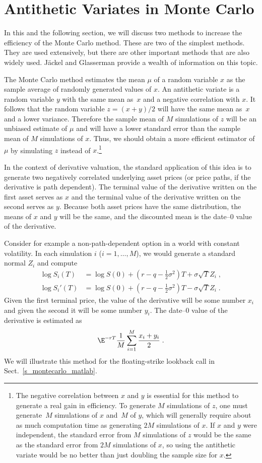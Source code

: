 \section{Antithetic Variates in Monte Carlo}

In this and the following section, we will discuss two methods to increase the efficiency of the Monte Carlo method.  These are two of the simplest methods.  They are used extensively, but there are other important methods that are also widely used.  J\"ackel \cite{Jackel} and Glasserman \cite{Glasserman} provide a wealth of information on this topic.

The Monte Carlo method estimates the mean $\mu$ of a random variable $x$ as the sample average of randomly generated values of $x$.  An antithetic variate  is a random variable $y$ with the same mean as~$x$ and a negative correlation with $x$.  It follows that the random variable $z=(x+y)/2$ will have the same mean as~$x$ and a lower variance.  Therefore the sample mean of $M$ simulations of $z$ will be an unbiased estimate of $\mu$ and will have a lower standard error than the sample mean of $M$ simulations of $x$.  Thus, we should obtain a more efficient estimator of $\mu$ by simulating $z$ instead of $x$.\footnote{
The negative correlation between $x$ and $y$ is essential for this method to generate a real gain in efficiency.  To generate $M$ simulations of $z$, one must generate~$M$ simulations of $x$ and~$M$ of $y$, which will generally require about as much computation time as generating $2M$ simulations of $x$.  If $x$ and $y$ were independent, the standard error from $M$ simulations of $z$ would be the same as the standard error from $2M$ simulations of $x$, so using the antithetic variate would be no better than just doubling the sample size for $x$.}

In the context of derivative valuation, the standard application of this idea is to generate two negatively correlated underlying asset prices (or price paths, if the derivative is path dependent).  The terminal value of the derivative written on the first asset serves as $x$ and the terminal value of the derivative written on the second serves as $y$.  Because both asset prices have the same distribution, the means of $x$ and $y$ will be the same, and the discounted mean is the date--0 value of the derivative. 

Consider for example a non-path-dependent option in a world with constant volatility.  In each simulation $i$ ($i=1,\ldots,M$), we would generate a standard normal $Z_i$ and compute
\begin{align*}
\log S_i(T) &= \log S(0) + \left(r-q-\frac{1}{2}\sigma^2\right)T + \sigma\sqrt{T}Z_i\; ,\\
\log S_i'(T) &= \log S(0) + \left(r-q-\frac{1}{2}\sigma^2\right)T - \sigma\sqrt{T}Z_i\;.
\end{align*}
Given the first terminal price, the value of the derivative will be some number $x_i$ and given the second it will be some number $y_i$.  The date--0 value of the derivative is estimated as
$$\E^{-rT}\frac{1}{M}\sum_{i=1}^M\frac{x_i+y_i}{2}\; .$$
We will illustrate this method for the floating-strike lookback call in Sect.~\ref{s_montecarlo_matlab}. 


